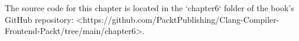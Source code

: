 \begin{markdown}

The source code for this chapter is located in the `chapter6` folder of the book’s GitHub repository: <https://github.com/PacktPublishing/Clang-Compiler-Frontend-Packt/tree/main/chapter6>.
\end{markdown}